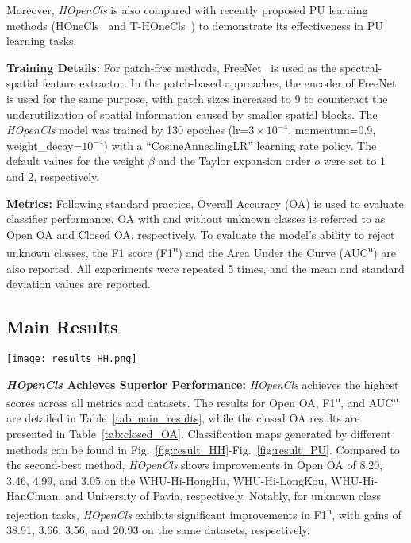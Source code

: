 Moreover, \textit{HOpenCls} is also compared with recently proposed PU learning methods (HOneCls~\cite{HOneCls} and T-HOneCls~\cite{T-HOneCls}) to demonstrate its effectiveness in PU learning tasks.

\noindent \textbf{Training Details:}
For patch-free methods, FreeNet~\cite{FPGA} is used as the spectral-spatial feature extractor. In the patch-based approaches, the encoder of FreeNet is used for the same purpose, with patch sizes increased to 9 to counteract the underutilization of spatial information caused by smaller spatial blocks. The \textit{HOpenCls} model was trained by 130 epoches (lr=$3{\times}10^{-4}$, momentum=0.9, weight\_decay=$10^{-4}$) with a ``CosineAnnealingLR'' learning rate policy. The default values for the weight $\beta$ and the Taylor expansion order $o$ were set to $1$ and $2$, respectively.

\noindent \textbf{Metrics:}
Following standard practice, Overall Accuracy (OA) is used to evaluate classifier performance. OA with and without unknown classes is referred to as Open OA and Closed OA, respectively. To evaluate the model’s ability to reject unknown classes, the F1 score (F1\textsuperscript{u}) and the Area Under the Curve (AUC\textsuperscript{u}) are also reported. All experiments were repeated 5 times, and the mean and standard deviation values are reported.

\subsection{Main Results}

\begin{figure*}[!t]
    \centering
    \texttt{[image: results\_HH.png]}
    \caption{Open-set classification maps of WHU-Hi-HongHu dataset.}
    \label{fig:result_HH}
\end{figure*}





\noindent \textbf{\textit{HOpenCls} Achieves Superior Performance:}
\textit{HOpenCls} achieves the highest scores across all metrics and datasets. The results for Open OA, F1\textsuperscript{u}, and AUC\textsuperscript{u} are detailed in Table~\ref{tab:main_results}, while the closed OA results are presented in Table~\ref{tab:closed_OA}. Classification maps generated by different methods can be found in Fig.~\ref{fig:result_HH}-Fig.~\ref{fig:result_PU}. Compared to the second-best method, \textit{HOpenCls} shows improvements in Open OA of 8.20, 3.46, 4.99, and 3.05 on the WHU-Hi-HongHu, WHU-Hi-LongKou, WHU-Hi-HanChuan, and University of Pavia, respectively. Notably, for unknown class rejection tasks, \textit{HOpenCls} exhibits significant improvements in F1\textsuperscript{u}, with gains of 38.91, 3.66, 3.56, and 20.93 on the same datasets, respectively.

